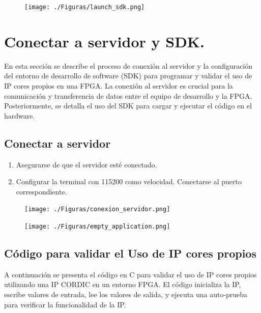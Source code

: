 \documentclass[12pt,a4paper, twoside]{article} %
\begin{document}
\begin{figure}[ht]
\centering
\texttt{[image: ./Figuras/launch\_sdk.png]}
\label{fig:launch SDK}
\end{figure}


\section{Conectar a servidor y SDK.}

En esta sección se describe el proceso de conexión al servidor y la configuración del entorno de desarrollo de software (SDK) para programar y validar el uso de IP cores propios en una FPGA. La conexión al servidor es crucial para la comunicación y transferencia de datos entre el equipo de desarrollo y la FPGA. Posteriormente, se detalla el uso del SDK para cargar y ejecutar el código en el hardware.


\subsection{Conectar a servidor}

\begin{enumerate}
    \item Asegurarse de que el servidor esté conectado.
    \item Configurar la terminal con 115200 como velocidad. Conectarse al puerto correspondiente.
\end{enumerate}

\begin{figure}[ht]
\centering
\texttt{[image: ./Figuras/conexion\_servidor.png]}
\label{fig:Conexión a servidor}
\end{figure}

\begin{figure}[ht]
\centering
\texttt{[image: ./Figuras/empty\_application.png]}
\label{fig:Empty application}
\end{figure}

\subsection{Código para validar el Uso de IP cores propios}

A continuación se presenta el código en C para validar el uso de IP cores propios utilizando una IP CORDIC en un entorno FPGA. El código inicializa la IP, escribe valores de entrada, lee los valores de salida, y ejecuta una auto-prueba para verificar la funcionalidad de la IP.
\end{document}
